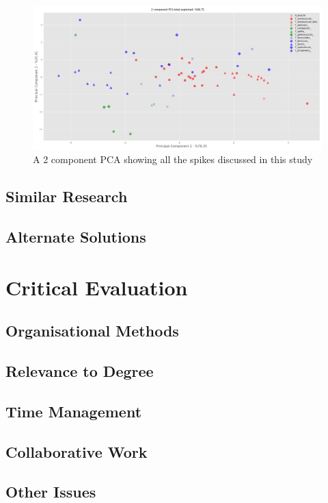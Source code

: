 \documentclass[11pt]{report}
\begin{document}
\begin{figure}[htbp]
\centering
\includegraphics[width=.9\linewidth]{./images/pca_all.png}
\caption{\label{fig:org086e8b8}
A 2 component PCA showing all the spikes discussed in this study}
\end{figure}

\section{Similar Research}
\label{sec:org5eb9670}
\section{Alternate Solutions}
\label{sec:orgfb973bb}
\chapter{Critical Evaluation}
\label{sec:org54acb73}
\section{Organisational Methods}
\label{sec:orga529951}
\section{Relevance to Degree}
\label{sec:org13a9b3d}
\section{Time Management}
\label{sec:org1d68149}
\section{Collaborative Work}
\label{sec:org055ce48}
\section{Other Issues}
\label{sec:org149941b}
\end{document}
